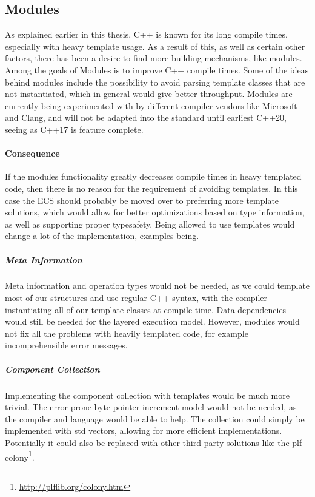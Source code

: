 \subsection{Modules}
\label{subsec:longevity_modules}
As explained earlier in this thesis, C++ is known
for its long compile times, especially with heavy template usage.
As a result of this, as well as certain other factors,
there has been a desire to find more building mechanisms, like modules.
Among the goals of Modules is to improve C++ compile times.
Some of the ideas behind modules include the possibility to avoid parsing
template classes that are not instantiated, which in general would give better throughput\cite[49:53]{cppcon_modules_state_of_the_union}.
Modules are currently being experimented with by different compiler vendors
like Microsoft\cite{microsoft_modules_support} and Clang\cite{clang_modules_support},
and will not be adapted into the standard until earliest C++20, seeing as C++17 is feature complete\cite{isocpp_standardization_status}.

\paragraph{Consequence}
If the modules functionality greatly decreases compile times in heavy templated code,
then there is no reason for the requirement of avoiding templates.
In this case the ECS should probably be moved over to preferring more template solutions,
which would allow for better optimizations based on type information, as well as supporting
proper typesafety.
Being allowed to use templates would change a lot of the implementation, examples being.

\subparagraph{Meta Information}
Meta information and operation types
would not be needed, as we could template most of our structures and use regular C++ syntax,
with the compiler instantiating all of our template classes at compile time.
Data dependencies would still be needed for the layered execution model.
However, modules would not fix all the problems with heavily templated code,
for example incomprehensible error messages.

\subparagraph{Component Collection}
Implementing the component collection with templates would be much more trivial.
The error prone byte pointer increment model would not be needed, as the compiler
and language would be able to help.
The collection could simply be implemented with std vectors, allowing for more
efficient implementations.
Potentially it could also be replaced with other third party solutions like
the plf colony\footnote{\url{http://plflib.org/colony.htm}}.

